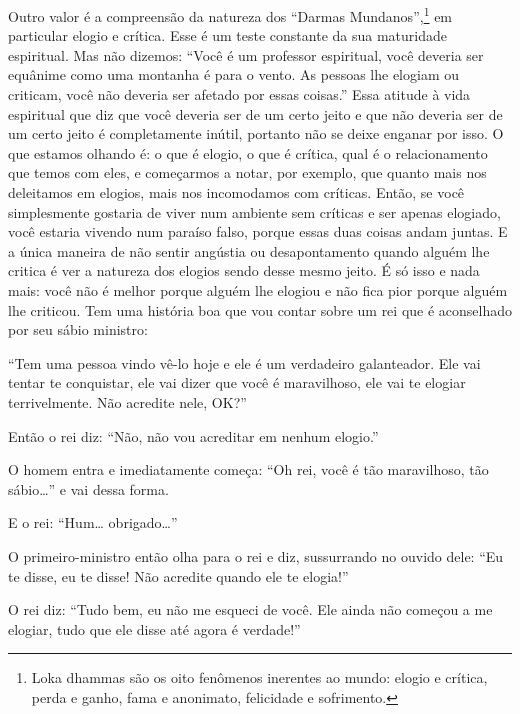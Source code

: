 Outro valor é a compreensão da natureza dos “Darmas
Mundanos”,\footnote{Loka dhammas são os oito fenômenos inerentes ao
mundo: elogio e crítica, perda e ganho, fama e anonimato, felicidade e
sofrimento.} em particular elogio e crítica. Esse é um teste constante
da sua maturidade espiritual. Mas não dizemos: “Você é um professor
espiritual, você deveria ser equânime como uma montanha é para o vento.
As pessoas lhe elogiam ou criticam, você não deveria ser afetado por
essas coisas.” Essa atitude à vida espiritual que diz que você deveria
ser de um certo jeito e que não deveria ser de um certo jeito é
completamente inútil, portanto não se deixe enganar por isso. O que
estamos olhando é: o que é elogio, o que é crítica, qual é o
relacionamento que temos com eles, e começarmos a notar, por exemplo,
que quanto mais nos deleitamos em elogios, mais nos incomodamos com
críticas. Então, se você simplesmente gostaria de viver num ambiente
sem críticas e ser apenas elogiado, você estaria vivendo num paraíso
falso, porque essas duas coisas andam juntas. E a única maneira de não
sentir angústia ou desapontamento quando alguém lhe critica é ver a
natureza dos elogios sendo desse mesmo jeito. É só isso e nada mais:
você não é melhor porque alguém lhe elogiou e não fica pior porque
alguém lhe criticou. Tem uma história boa que vou contar sobre um rei
que é aconselhado por seu sábio ministro: 

“Tem uma pessoa vindo vê-lo hoje e ele é um verdadeiro galanteador.
Ele vai tentar te conquistar, ele vai dizer que você é maravilhoso, ele
vai te elogiar terrivelmente. Não acredite nele, OK?” 

Então o rei diz: “Não, não vou acreditar em nenhum elogio.” 

O homem entra e imediatamente começa: “Oh rei, você é tão
maravilhoso, tão sábio…” e vai dessa forma.

E o rei: “Hum… obrigado…”

O primeiro-ministro então olha para o rei e diz, sussurrando no
ouvido dele: “Eu te disse, eu te disse! Não acredite quando ele te
elogia!” 

O rei diz: “Tudo bem, eu não me esqueci de você. Ele ainda não
começou a me elogiar, tudo que ele disse até agora é verdade!” 

